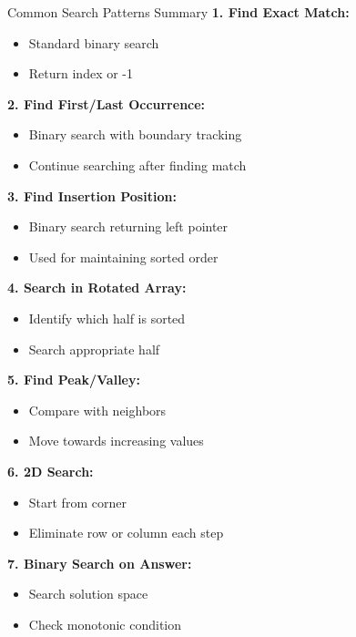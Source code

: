 \documentclass[aspectratio=169]{beamer}
\begin{document}
\begin{frame}{Common Search Patterns Summary}
  \textbf{1. Find Exact Match:}
  \begin{itemize}
    \item Standard binary search
    \item Return index or -1
  \end{itemize}

  \vspace{0.2cm}
  \textbf{2. Find First/Last Occurrence:}
  \begin{itemize}
    \item Binary search with boundary tracking
    \item Continue searching after finding match
  \end{itemize}

  \vspace{0.2cm}
  \textbf{3. Find Insertion Position:}
  \begin{itemize}
    \item Binary search returning left pointer
    \item Used for maintaining sorted order
  \end{itemize}

  \vspace{0.2cm}
  \textbf{4. Search in Rotated Array:}
  \begin{itemize}
    \item Identify which half is sorted
    \item Search appropriate half
  \end{itemize}

  \vspace{0.2cm}
  \textbf{5. Find Peak/Valley:}
  \begin{itemize}
    \item Compare with neighbors
    \item Move towards increasing values
  \end{itemize}

  \vspace{0.2cm}
  \textbf{6. 2D Search:}
  \begin{itemize}
    \item Start from corner
    \item Eliminate row or column each step
  \end{itemize}

  \vspace{0.2cm}
  \textbf{7. Binary Search on Answer:}
  \begin{itemize}
    \item Search solution space
    \item Check monotonic condition
  \end{itemize}
\end{frame}
\end{document}
